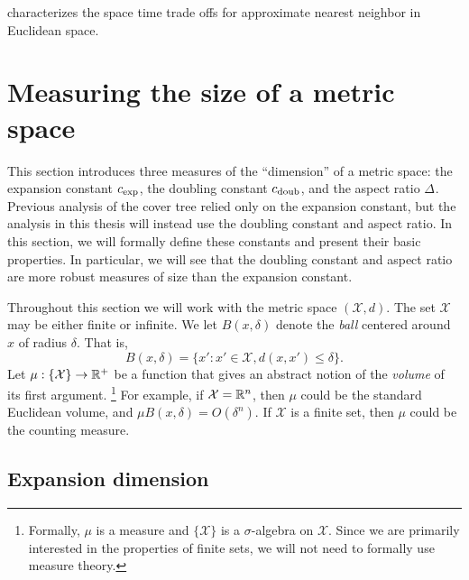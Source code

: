 \documentclass[../main.tex]{subfiles}
\newcommand{\set}[1]{\mathcal {#1}}
\newcommand{\dist}[2]{\distf({#1},{#2})}
\newcommand{\distf}{d}
\newcommand{\aspect}[1]{\Delta_{#1}}
\newcommand{\cexp}{c_\textnormal{exp}}
\newcommand{\cdoub}{c_\textnormal{doub}}
\begin{document}
\cite{arya2009space} characterizes the space time trade offs for approximate nearest neighbor in Euclidean space.


\section{Measuring the size of a metric space}

This section introduces three measures of the ``dimension'' of a metric space:
the expansion constant $\cexp$, the doubling constant $\cdoub$, and the aspect ratio $\aspect{}$.
Previous analysis of the cover tree relied only on the expansion constant,
but the analysis in this thesis will instead use the doubling constant and aspect ratio.
In this section, we will formally define these constants and present their basic properties.
In particular, we will see that the doubling constant and aspect ratio are more robust measures of size than the expansion constant.

Throughout this section we will work with the metric space $(\set X,d)$.
The set $\set X$ may be either finite or infinite.
We let $B(x,\delta)$ denote the \emph{ball} centered around $x$ of radius $\delta$. 
That is,
\begin{equation}
    B(x,\delta) = \{ x' : x'\in\set X, \dist{x}{x'} \le \delta \}.
\end{equation}
Let $\mu : \{\set X\} \to \R^+$ be a function that gives an abstract notion of the \emph{volume} of its first argument.%
\footnote{
    Formally, $\mu$ is a measure and $\{\set X\}$ is a $\sigma$-algebra on $\set X$.
    Since we are primarily interested in the properties of finite sets,
    we will not need to formally use measure theory.
}
For example, if $\set X=\R^n$, then $\mu$ could be the standard Euclidean volume,
and $\mu B(x,\delta) = O(\delta^n)$.
If $\set X$ is a finite set, then $\mu$ could be the counting measure.


\subsection{Expansion dimension}
\end{document}
